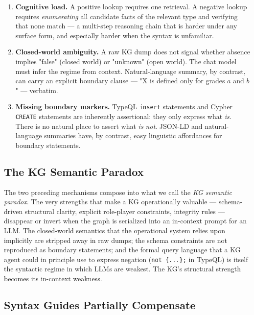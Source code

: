 \begin{enumerate}
\item \textbf{Cognitive load.} A positive lookup requires one
      retrieval. A negative lookup requires \emph{enumerating} all
      candidate facts of the relevant type and verifying that none
      match — a multi-step reasoning chain that is harder under any
      surface form, and especially harder when the syntax is
      unfamiliar.
\item \textbf{Closed-world ambiguity.} A raw KG dump does not signal
      whether absence implies "false" (closed world) or "unknown"
      (open world). The chat model must infer the regime from
      context. Natural-language summary, by contrast, can carry an
      explicit boundary clause — "X is defined only for grades $a$
      and $b$" — verbatim.
\item \textbf{Missing boundary markers.} TypeQL \texttt{insert}
      statements and Cypher \texttt{CREATE} statements are inherently
      assertional: they only express what \emph{is}. There is no
      natural place to assert what \emph{is not}. JSON-LD and
      natural-language summaries have, by contrast, easy linguistic
      affordances for boundary statements.
\end{enumerate}

\subsection{The KG Semantic Paradox}

The two preceding mechanisms compose into what we call the \emph{KG
semantic paradox}. The very strengths that make a KG operationally
valuable — schema-driven structural clarity, explicit role-player
constraints, integrity rules — disappear or invert when the graph is
serialized into an in-context prompt for an LLM. The closed-world
semantics that the operational system relies upon implicitly are
stripped away in raw dumps; the schema constraints are not
reproduced as boundary statements; and the formal query language
that a KG agent could in principle use to express negation
(\texttt{not \{...\};} in TypeQL) is itself the syntactic regime in
which LLMs are weakest. The KG's structural strength becomes its
in-context weakness.

\subsection{Syntax Guides Partially Compensate}


